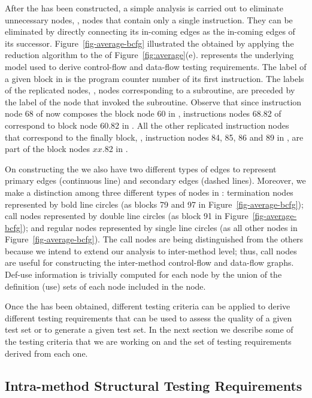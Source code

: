 After the \BG has been constructed, a simple analysis is carried
out to eliminate unnecessary nodes, \ie, nodes that contain only a
single  instruction. They can be eliminated by directly
connecting its in-coming edges as the in-coming edges of its
successor. Figure~\ref{fig-average-bcfg} illustrated the \BG
obtained by applying the reduction algorithm to the \IG of
Figure~\ref{fig:average}(e). \BG represents the underlying model
used to derive control-flow and data-flow testing requirements.
The label of a given block in \BG is the program counter number of
its first instruction. The labels of the replicated nodes, \ie,
nodes corresponding to a subroutine, are preceded by the label of
the node that invoked the subroutine. Observe that since
instruction node 68 of \IG now composes the block node 60 in \BG,
instructions nodes 68.82 of \IG correspond to block node 60.82 in
\BG. All the other replicated instruction nodes that correspond to
the finally block, \ie, instruction nodes 84, 85, 86 and 89 in
\IG, are part of the block nodes $xx$.82 in \BG.

On constructing the \BG we also have two different types of edges
to represent primary edges (continuous line) and secondary edges
(dashed lines). Moreover, we make a distinction among three
different types of nodes in \BG: termination nodes represented by
bold line circles (as blocks 79 and 97 in
Figure~\ref{fig-average-bcfg}); call nodes represented by double
line circles (as block 91 in Figure~\ref{fig-average-bcfg}); and
regular nodes represented by single line circles (as all other
nodes in Figure~\ref{fig-average-bcfg}). The call nodes are being
distinguished from the others because we intend to extend our
analysis to inter-method level; thus, call nodes are useful for
constructing the inter-method control-flow and data-flow graphs.
Def-use information is trivially computed for each \BG node by the
union of the definition (use) sets of each \IG node included in
the \BG node.

Once the \BG has been obtained, different testing criteria can be
applied to derive different testing requirements that can be used
to assess the quality of a given test set or to generate a given
test set. In the next section we describe some of the testing
criteria that we are working on and the set of testing
requirements derived from each one.

\subsection{Intra-method Structural Testing Requirements}\label{sec:criteria}

